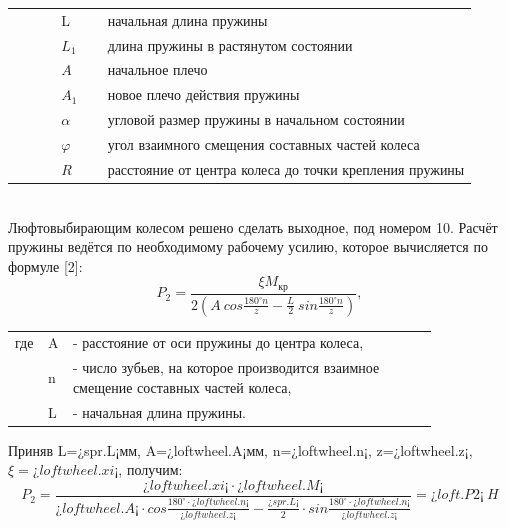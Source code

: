 \documentclass[14pt,a4paper,russian]{scrartcl}
\begin{document}
        \begin{table}[h]
                \begin{tabular}{p{0.1\linewidth}p{0.1\linewidth}p{0.8\linewidth}}
                    & L & начальная длина пружины \\
                    & \( L_1 \) & длина пружины в растянутом состоянии \\
                    & \( A \) & начальное плечо \\
                    & \( A_1 \) & новое плечо действия пружины \\
                    & \( \alpha \) & угловой размер пружины в начальном состоянии \\
                    & \( \varphi \) & угол взаимного смещения составных частей колеса \\
                    & \( R \) & расстояние от центра колеса до точки крепления пружины \\
                \end{tabular}
        \end{table}
        \\Люфтовыбирающим колесом решено сделать выходное, под номером 10.
        Расчёт пружины ведётся по необходимому рабочему усилию, которое
        вычисляется по формуле [2]:
        \[ P_2 = \frac{\xi M_{\text{кр}}}{2(A\ cos\frac{180^\circ n}{z}
                - \frac{L}{2}\ sin\frac{180^\circ n}{z})},\]
        \begin{table}[h!]
            \begin{center}
                \begin{tabular}{p{0.025\linewidth}p{0.01\linewidth}p{0.8\linewidth}}
                    где & A & - расстояние от оси пружины до центра колеса,\\
                    & n & - число зубьев, на которое производится взаимное смещение составных частей колеса,\\
                    & L & - начальная длина пружины.
                \end{tabular}
            \end{center}
        \end{table}

        Приняв L=¿spr.L¡мм, A=¿loftwheel.A¡мм, n=¿loftwheel.n¡, 
        z=¿loftwheel.z¡, \( \xi=¿loftwheel.xi¡ \), получим:
        \[ P_2 = \frac{¿loftwheel.xi¡\cdot¿loftwheel.M¡}{¿loftwheel.A¡\cdot cos\frac{180^\circ\cdot¿loftwheel.n¡}{¿loftwheel.z¡}
                - \frac{¿spr.L¡}{2}\cdot sin\frac{180^\circ\cdot¿loftwheel.n¡}{¿loftwheel.z¡}} = ¿loft.P2¡\ H\]
        
\end{document}
